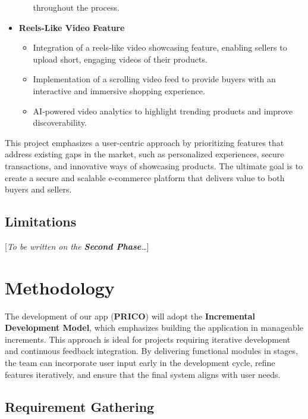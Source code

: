 \documentclass[12pt]{report}
\begin{document}
\begin{itemize}
\begin{itemize}
		            throughout the process.
	      \end{itemize}
	\item \textbf{Reels-Like Video Feature}
	      \begin{itemize}
		      \item Integration of a reels-like video showcasing feature, enabling sellers to upload
		            short, engaging videos of their products.
		      \item Implementation of a scrolling video feed to provide buyers with an interactive
		            and immersive shopping experience.
		      \item AI-powered video analytics to highlight trending products and improve
		            discoverability.
	      \end{itemize}
\end{itemize}

This project emphasizes a user-centric approach by prioritizing features that address existing
gaps in the market, such as personalized experiences, secure transactions, and innovative
ways of showcasing products. The ultimate goal is to create a secure and scalable
e-commerce platform that delivers value to both buyers and sellers.

\subsection{Limitations}

[\textit{To be written on the \textbf{Second Phase}\dots}]

\section{Methodology}

The development of our app (\textbf{PRICO}) will adopt the \textbf{Incremental Development Model},
which emphasizes building the application in manageable increments. This approach is ideal
for projects requiring iterative development and continuous feedback integration. By
delivering functional modules in stages, the team can incorporate user input early in the
development cycle, refine features iteratively, and ensure that the final system aligns with
user needs\cite{c8}.

\subsection{Requirement Gathering}
\end{document}
